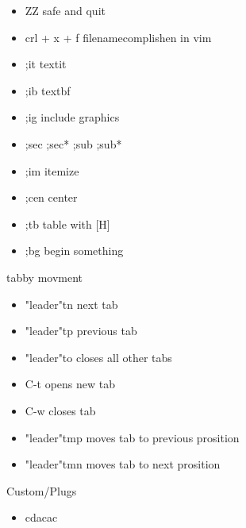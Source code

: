 \documentclass[12pt]{article}
\begin{document}
\begin{itemize}
    \item ZZ safe and quit
    \item crl + x + f filenamecomplishen in vim
    \item ;it textit{}
    \item ;ib textbf{}
    \item ;ig include graphics
    \item ;sec ;sec* ;sub ;sub*
    \item ;im itemize
    \item ;cen center
    \item ;tb table with [H]
    \item ;bg begin something
\end{itemize}

tabby movment 
\begin{itemize}
    \item "leader"tn next tab
    \item "leader"tp previous tab
    \item "leader"to closes all other tabs
    \item C-t opens new tab
    \item C-w closes tab 
    \item "leader"tmp moves tab to previous prosition
    \item "leader"tmn moves tab to next prosition
\end{itemize}

Custom/Plugs
\begin{itemize}

    \item  cdacac

\end{itemize}
\end{document}
